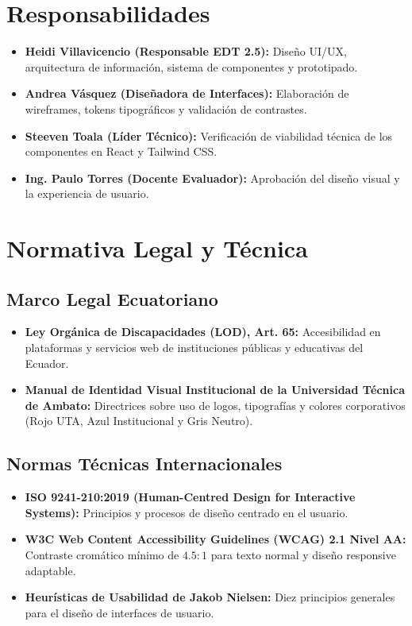 \documentclass[12pt,a4paper]{article}
\begin{document}
\section{Responsabilidades}
\begin{itemize}[leftmargin=1.5em, itemsep=2pt]
    \item \textbf{Heidi Villavicencio (Responsable EDT 2.5):} Diseño UI/UX, arquitectura de información, sistema de componentes y prototipado.
    \item \textbf{Andrea Vásquez (Diseñadora de Interfaces):} Elaboración de wireframes, tokens tipográficos y validación de contrastes.
    \item \textbf{Steeven Toala (Líder Técnico):} Verificación de viabilidad técnica de los componentes en React y Tailwind CSS.
    \item \textbf{Ing. Paulo Torres (Docente Evaluador):} Aprobación del diseño visual y la experiencia de usuario.
\end{itemize}

\section{Normativa Legal y Técnica}
\subsection{Marco Legal Ecuatoriano}
\begin{itemize}[leftmargin=1.5em, itemsep=2pt]
    \item \textbf{Ley Orgánica de Discapacidades (LOD), Art. 65:} Accesibilidad en plataformas y servicios web de instituciones públicas y educativas del Ecuador.
    \item \textbf{Manual de Identidad Visual Institucional de la Universidad Técnica de Ambato:} Directrices sobre uso de logos, tipografías y colores corporativos (Rojo UTA, Azul Institucional y Gris Neutro).
\end{itemize}
\subsection{Normas Técnicas Internacionales}
\begin{itemize}[leftmargin=1.5em, itemsep=2pt]
    \item \textbf{ISO 9241-210:2019 (Human-Centred Design for Interactive Systems):} Principios y procesos de diseño centrado en el usuario.
    \item \textbf{W3C Web Content Accessibility Guidelines (WCAG) 2.1 Nivel AA:} Contraste cromático mínimo de $4.5:1$ para texto normal y diseño responsive adaptable.
    \item \textbf{Heurísticas de Usabilidad de Jakob Nielsen:} Diez principios generales para el diseño de interfaces de usuario.
\end{itemize}
\end{document}
